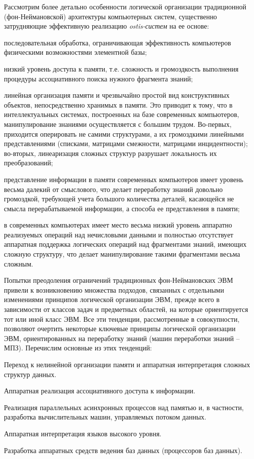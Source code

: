 Рассмотрим более детально особенности логической организации традиционной (фон-Неймановской) архитектуры компьютерных систем, существенно затрудняющие эффективную реализацию \textit{ostis-систем} на ее основе:
\begin{textitemize}
	\item последовательная обработка, ограничивающая эффективность компьютеров физическими возможностями элементной базы;
	\item низкий уровень доступа к памяти, т.е. сложность и громоздкость выполнения процедуры ассоциативного поиска нужного фрагмента знаний; 
	\item линейная организация памяти и чрезвычайно простой вид конструктивных объектов, непосредственно хранимых в памяти. Это приводит к тому, что в интеллектуальных системах, построенных на базе современных компьютеров, манипулирование знаниями осуществляется с большим трудом. Во-первых, приходится оперировать не самими структурами, а их громоздкими линейными представлениями (списками, матрицами смежности, матрицами инцидентности); во-вторых, линеаризация сложных структур разрушает локальность их преобразований;
	\item представление информации в памяти современных компьютеров имеет уровень весьма далекий от смыслового, что делает переработку знаний довольно громоздкой, требующей учета большого количества деталей, касающейся не смысла перерабатываемой информации, а способа ее представления в памяти;
	\item в современных компьютерах имеет место весьма низкий уровень аппаратно реализуемых операций над нечисловыми данными и полностью отсутствует аппаратная поддержка логических операций над фрагментами знаний, имеющих сложную структуру, что делает манипулирование такими фрагментами весьма сложным.
\end{textitemize}

Попытки преодоления ограничений традиционных фон-Неймановских ЭВМ привели к возникновению множества подходов, связанных с отдельными изменениями принципов логической организации ЭВМ, прежде всего в зависимости от классов задач и предметных областей, на которые ориентируется тот или иной класс ЭВМ. Все эти тенденции, рассмотренные в совокупности, позволяют очертить некоторые ключевые принципы логической организации ЭВМ, ориентированных на переработку знаний (машин переработки знаний -- МПЗ). Перечислим основные из этих тенденций:
\begin{textitemize}
\item Переход к нелинейной организации памяти и аппаратная интерпретация сложных структур данных.
\item Аппаратная реализация ассоциативного доступа к информации.
\item Реализация параллельных асинхронных процессов над памятью и, в частности, разработка вычислительных машин, управляемых потоком данных.
\item Аппаратная интерпретация языков высокого уровня.
\item Разработка аппаратных средств ведения баз данных (процессоров баз данных).
\end{textitemize}
	
